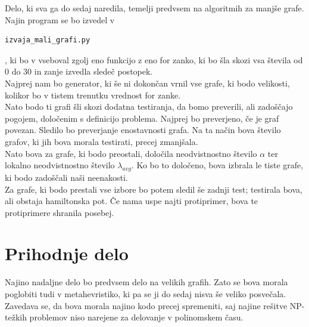 \documentclass[12pt,a4paper]{amsart}
\begin{document}
Delo, ki sva ga do sedaj naredila, temelji predvsem na algoritmih za manjše grafe. Najin program se bo izvedel v \begin{verbatim}
izvaja_mali_grafi.py
\end{verbatim}, ki bo v vseboval zgolj eno funkcijo z eno for zanko, ki bo šla skozi vsa števila od 0 do 30 in zanje izvedla sledeč postopek.\\
Najprej nam bo generator, ki še ni dokončan vrnil vse grafe, ki bodo velikosti, kolikor bo v tistem trenutku vrednost for zanke.\\
 Nato bodo ti grafi šli skozi dodatna testiranja, da bomo preverili, ali zadoščajo pogojem, določenim s definicijo problema. Najprej bo preverjeno, če je graf povezan. Sledilo bo preverjanje enostavnosti grafa. Na ta način bova število grafov, ki jih bova morala testirati, precej zmanjšala. \\
 Nato bova za grafe, ki bodo preostali, določila neodvistnostno število $\alpha$ ter lokalno neodvistnostno število $\lambda_{avg}$. Ko bo to določeno, bova izbrala le tiste grafe, ki bodo zadoščali naši neenakosti. \\
 Za grafe, ki bodo prestali vse izbore bo potem sledil še zadnji test; testirala bova, ali obstaja hamiltonska pot. Če nama uspe najti protiprimer, bova te protiprimere shranila posebej.
\section{Prihodnje delo}
Najino nadaljne delo bo predvsem delo na velikih grafih. Zato se bova morala poglobiti tudi v metahevristiko, ki pa se ji do sedaj nisva še veliko posvečala. Zavedava se, da bova morala najino kodo precej spremeniti, saj najine rešitve NP-težkih problemov niso narejene za delovanje v polinomskem času.
\end{document}
